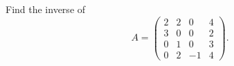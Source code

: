 \documentclass{ximera}
\begin{document}
\begin{exercise}
Find the inverse of 
\[A = \left(\begin{array}{cccc}
2 & 2 & 0 & 4\\
3 & 0 &0& 2\\
0& 1 & 0 & 3\\
0 & 2 & -1 & 4
\end{array}\right).
\]

\end{exercise} 
\end{document}
